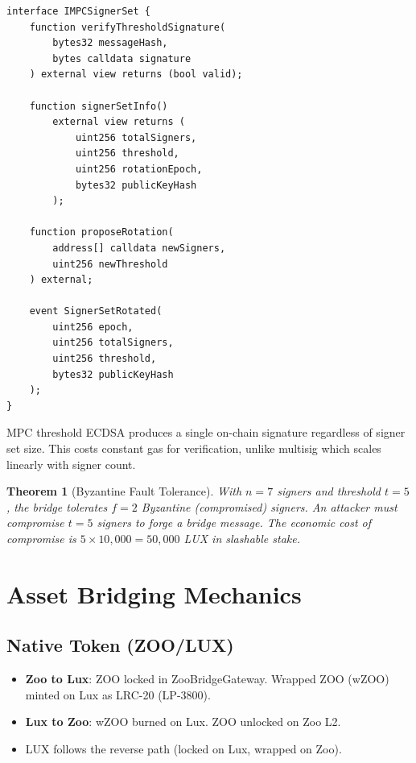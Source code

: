 \documentclass[11pt,letterpaper]{article}
\newtheorem{theorem}{Theorem}[section]
\begin{document}
\begin{lstlisting}[language=Solidity,caption=IMPCSignerSet interface]
interface IMPCSignerSet {
    function verifyThresholdSignature(
        bytes32 messageHash,
        bytes calldata signature
    ) external view returns (bool valid);

    function signerSetInfo()
        external view returns (
            uint256 totalSigners,
            uint256 threshold,
            uint256 rotationEpoch,
            bytes32 publicKeyHash
        );

    function proposeRotation(
        address[] calldata newSigners,
        uint256 newThreshold
    ) external;

    event SignerSetRotated(
        uint256 epoch,
        uint256 totalSigners,
        uint256 threshold,
        bytes32 publicKeyHash
    );
}
\end{lstlisting}

MPC threshold ECDSA produces a single on-chain signature regardless of signer set size. This costs constant gas for verification, unlike multisig which scales linearly with signer count.

\begin{theorem}[Byzantine Fault Tolerance]
With $n = 7$ signers and threshold $t = 5$, the bridge tolerates $f = 2$ Byzantine (compromised) signers. An attacker must compromise $t = 5$ signers to forge a bridge message. The economic cost of compromise is $5 \times 10{,}000 = 50{,}000$ LUX in slashable stake.
\end{theorem}

\section{Asset Bridging Mechanics}

\subsection{Native Token (ZOO/LUX)}

\begin{itemize}
    \item \textbf{Zoo to Lux}: ZOO locked in ZooBridgeGateway. Wrapped ZOO (wZOO) minted on Lux as LRC-20 (LP-3800).
    \item \textbf{Lux to Zoo}: wZOO burned on Lux. ZOO unlocked on Zoo L2.
    \item LUX follows the reverse path (locked on Lux, wrapped on Zoo).
\end{itemize}
\end{document}
